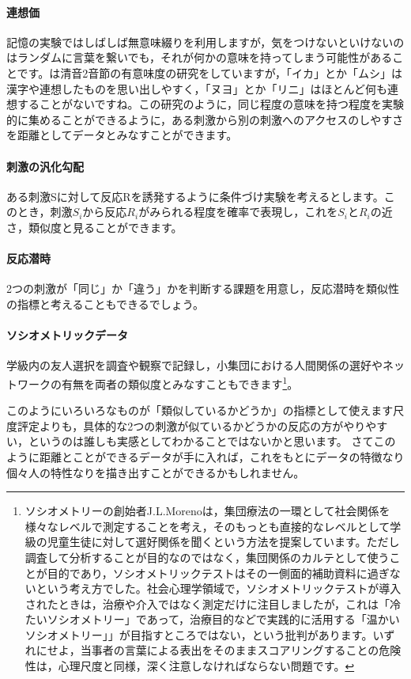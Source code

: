 \documentclass{ltjsbook}
\begin{document}
\paragraph{連想価}記憶の実験ではしばしば無意味綴りを利用しますが，気をつけないといけないのはランダムに言葉を繋いでも，それが何かの意味を持ってしまう可能性があることです。\textcite{Umemoto1955}は清音2音節の有意味度の研究をしていますが，「イカ」とか「ムシ」は漢字や連想したものを思い出しやすく，「ヌヨ」とか「リニ」はほとんど何も連想することがないですね。この研究のように，同じ程度の意味を持つ程度を実験的に集めることができるように，ある刺激から別の刺激へのアクセスのしやすさを距離としてデータとみなすことができます。
\paragraph{刺激の汎化勾配}ある刺激Sに対して反応Rを誘発するように条件づけ実験を考えるとします。このとき，刺激$S_i$から反応$R_i$がみられる程度を確率で表現し，これを$S_i$と$R_i$の近さ，類似度と見ることができます。
\paragraph{反応潜時}2つの刺激が「同じ」か「違う」かを判断する課題を用意し，反応潜時を類似性の指標と考えることもできるでしょう。
\paragraph{ソシオメトリックデータ}学級内の友人選択を調査や観察で記録し，小集団における人間関係の選好やネットワークの有無を両者の類似度とみなすこともできます\footnote{ソシオメトリーの創始者J.L.Morenoは，集団療法の一環として社会関係を様々なレベルで測定することを考え，そのもっとも直接的なレベルとして学級の児童生徒に対して選好関係を聞くという方法を提案しています。ただし調査して分析することが目的なのではなく，集団関係のカルテとして使うことが目的であり，ソシオメトリックテストはその一側面的補助資料に過ぎないという考え方でした。社会心理学領域で，ソシオメトリックテストが導入されたときは，治療や介入ではなく測定だけに注目しましたが，これは「冷たいソシオメトリー」であって，治療目的などで実践的に活用する「温かいソシオメトリー」」が目指すところではない，という批判があります\parencite{TanakaKumajiro}。いずれにせよ，当事者の言葉による表出をそのままスコアリングすることの危険性は，心理尺度と同様，深く注意しなければならない問題です。}。

このようにいろいろなものが「類似しているかどうか」の指標として使えます尺度評定よりも，具体的な2つの刺激が似ているかどうかの反応の方がやりやすい，というのは誰しも実感としてわかることではないかと思います。
さてこのように距離とことができるデータが手に入れば，これをもとにデータの特徴なり個々人の特性なりを描き出すことができるかもしれません。
\end{document}
